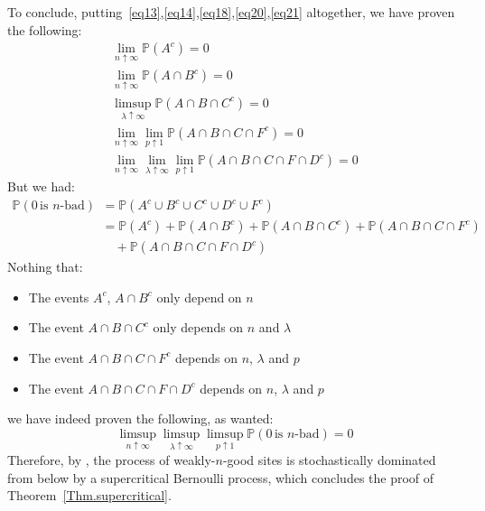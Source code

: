\documentclass[10pt,a4paper]{amsart}
\theoremstyle{exampstyle}
\theoremstyle{exampnotations}
\begin{document}
To conclude, putting~\eqref{eq13},\eqref{eq14},\eqref{eq18},\eqref{eq20},\eqref{eq21} altogether, we have proven the following:
\begin{gather*}
    \lim_{n \uparrow \infty}\mathbb{P}(A^c) = 0 
    \\ \lim_{n \uparrow \infty}\mathbb{P}(A \cap B^c) = 0 
    \\ \limsup_{\lambda \uparrow \infty} \mathbb{P}(A \cap B \cap C^c) = 0
  \\ \lim_{n \uparrow \infty}\lim_{p \uparrow 1} \mathbb{P}(A \cap B \cap C \cap F^c) = 0 
  \\ \lim_{n \uparrow \infty}\lim_{\lambda \uparrow \infty}\lim_{p \uparrow 1} \mathbb{P}(A \cap B \cap C \cap F \cap D^{c}) = 0
\end{gather*}
But we had:
\begin{align*}
    \mathbb{P}(0 \, \text{is $n$-bad}) &= \mathbb{P}(A^c \cup B^c \cup C^c \cup D^c \cup F^c)
\\ &= \mathbb{P}(A^c) + \mathbb{P}(A \cap B^c) + \mathbb{P}(A \cap B \cap C^c) + \mathbb{P}(A \cap B \cap C \cap F^c) \\ & \quad + \mathbb{P}(A \cap B \cap C \cap F \cap D^c)
\end{align*}
Nothing that:
\begin{itemize}
    \item The events $A^c$, $A \cap B^c$ only depend on $n$
    \item The event $A \cap B \cap C^c$ only depends on $n$ and $\lambda$
    \item The event $A \cap B \cap C \cap F^c$ depends on $n$, $\lambda$ and $p$
    \item The event $A \cap B \cap C \cap F \cap D^c$ depends on $n$, $\lambda$ and $p$
\end{itemize} 
we have indeed proven the following, as wanted:
\begin{equation*}
    \limsup_{n \uparrow \infty}\limsup_{\lambda \uparrow \infty}\limsup_{p \uparrow 1} \mathbb{P}(0 \, \text{is $n$-bad}) = 0
\end{equation*}
Therefore, by \cite[Theorem 0.0]{liggett_domination_1997}, the process of weakly-$n$-good sites is stochastically dominated from below by a supercritical Bernoulli process, which concludes the proof of Theorem~\ref{Thm.supercritical}.


\end{document}

